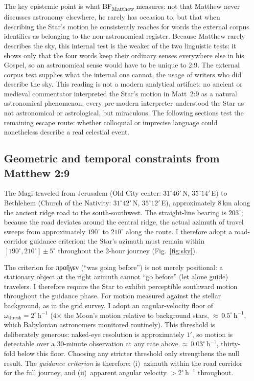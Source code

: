 \documentclass[sn-nature]{sn-jnl}
\newcommand{\grk}[1]{{\fontencoding{LGR}\selectfont #1}}
\newcommand{\grk}[1]{{\greekfont #1}}
\begin{document}
The key epistemic point is what BF\textsubscript{Matthew} measures: not that Matthew never
discusses astronomy elsewhere, he rarely has occasion to, but that when
describing the Star's motion he consistently reaches for words the external
corpus identifies as belonging to the non-astronomical register. Because
Matthew rarely describes the sky, this internal test is the weaker of the two
linguistic tests: it shows only that the four words keep their ordinary senses
everywhere else in his Gospel, so an astronomical sense would have to be unique
to 2:9. The external corpus test supplies what the internal one cannot, the
usage of writers who did describe the sky. This reading
is not a modern analytical artifact: no ancient or medieval commentator
interpreted the Star's motion in Matt~2:9 as a natural astronomical
phenomenon\cite{adair2012}; every pre-modern interpreter understood the Star
as not astronomical or astrological, but miraculous. The
following sections test the remaining escape route: whether colloquial or
imprecise language could nonetheless describe a real celestial event.

\subsection{Geometric and temporal constraints from Matthew 2:9}
\label{subsec:constraints}

The Magi traveled from Jerusalem (Old City center: $31^\circ 46'$\,N,
$35^\circ 14'$\,E) to Bethlehem (Church of the Nativity: $31^\circ 42'$\,N,
$35^\circ 12'$\,E), approximately 8\,km along the ancient ridge road to the
south-southwest. The straight-line bearing is $203^\circ$; because the road
deviates around the central ridge, the actual azimuth of travel sweeps from
approximately $190^\circ$ to $210^\circ$ along the route. I therefore adopt a
road-corridor guidance criterion: the Star's azimuth must remain within
$[190^\circ, 210^\circ] \pm 5^\circ$ throughout the 2-hour journey
(Fig.~\ref{fig:sky}).

The criterion for \grk{προῆγεν} (``was going before'') is not merely
positional: a stationary object at the right azimuth cannot ``go before'' 
(let alone guide) travelers\cite{adair2013star}.
I therefore require the Star to exhibit perceptible southward motion throughout
the guidance phase. For motion measured against the stellar background, as
in the grid survey, I adopt an angular-velocity floor of
$\omega_\mathrm{thresh} = 2^\circ\,\mathrm{h}^{-1}$ (4$\times$ the Moon's
motion relative to background stars, ${\approx}\,0.5^\circ\,\mathrm{h}^{-1}$,
which Babylonian astronomers monitored routinely). This threshold is
deliberately generous: naked-eye resolution is approximately $1'$, so motion
is detectable over a 30-minute observation at any rate above
${\approx}\,0.03^\circ\,\mathrm{h}^{-1}$, thirty-fold below this floor.
Choosing any stricter threshold only strengthens the null result.
The \textit{guidance criterion} is therefore: (i)~azimuth within the road
corridor for the full journey, and (ii)~apparent angular velocity
$> 2^\circ\,\mathrm{h}^{-1}$ throughout.
\end{document}
